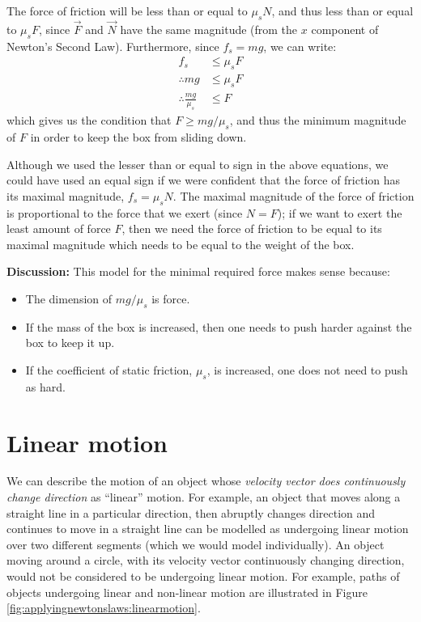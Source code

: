\begin{example}
The force of friction will be less than or equal to $\mu_sN$, and thus less than or equal to $\mu_s F$, since $\vec F$ and $\vec N$ have the same magnitude (from the $x$ component of Newton's Second Law). Furthermore, since $f_s=mg$, we can write:
\begin{align*}
f_s &\leq \mu_s F\\
\therefore mg &\leq \mu_s F\\
\therefore \frac{mg}{\mu_s} &\leq F
\end{align*}
which gives us the condition that $F\geq mg/\mu_s$, and thus the minimum magnitude of $F$ in order to keep the box from sliding down.

Although we used the lesser than or equal to sign in the above equations, we could have used an equal sign if we were confident that the force of friction has its maximal magnitude, $f_s=\mu_sN$. The maximal magnitude of the force of friction is proportional to the force that we exert (since $N=F$); if we want to exert the least amount of force $F$, then we need the force of friction to be equal to its maximal magnitude which needs to be equal to the weight of the box. 

\textbf{Discussion:} This model for the minimal required force makes sense because:
\begin{itemize}
\item The dimension of $mg/\mu_s$ is force.
\item If the mass of the box is increased, then one needs to push harder against the box to keep it up.
\item If the coefficient of static friction, $\mu_s$, is increased, one does not need to push as hard. 
\end{itemize}
\end{example}

\section{Linear motion}
We can describe the motion of an object whose \textit{velocity vector does continuously change direction} as ``linear'' motion. For example, an object that moves along a straight line in a particular direction, then abruptly changes direction and continues to move in a straight line can be modelled as undergoing linear motion over two different segments (which we would model individually). An object moving around a circle, with its velocity vector continuously changing direction, would not be considered to be undergoing linear motion. For example, paths of objects undergoing linear and non-linear motion are illustrated in Figure \ref{fig:applyingnewtonslaws:linearmotion}.

